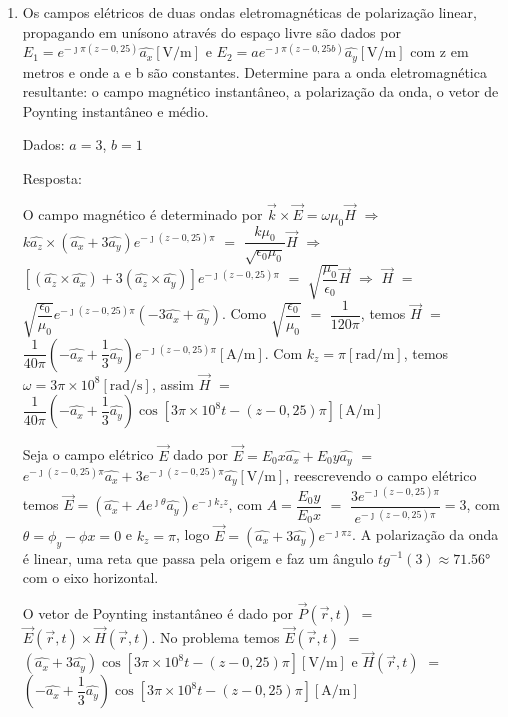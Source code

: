 \begin{enumerate}[1.]
\item Os campos elétricos de duas ondas eletromagnéticas de polarização linear, propagando em unísono através do espaço livre são dados por $E_{1} = e^{-\jmath \pi (z - 0,25)} \hat{a_{x}} [\si{\volt/\meter}]$ e $E_{2} = ae^{-\jmath \pi (z - 0,25b)} \hat{a_{y}} [\si{\volt/\meter}]$ com z em metros e onde a e b são constantes. Determine para a onda eletromagnética resultante: o campo magnético instantâneo, a polarização da onda, o vetor de Poynting instantâneo e médio.  
  

    Dados: $a = 3$, $b = 1$


    Resposta:

    O campo magnético é determinado por $\vec{k} \times \vec{E} = \omega \mu_{0} \vec{H}$ $\Rightarrow$ $k\hat{a_{z}} \times (\hat{a_{x}} + 3\hat{a_{y}})e^{-\jmath (z - 0,25)\pi}$ $=$ $\dfrac{k \mu_{0}}{\sqrt{\epsilon_{0}\mu_{0}}} \vec{H}$ $\Rightarrow$ $\left[ (\hat{a_{z}} \times \hat{a_{x}}) + 3(\hat{a_{z}} \times \hat{a_{y}}) \right]e^{-\jmath (z - 0,25)\pi}$ $=$ $\sqrt{\dfrac{\mu_{0}}{\epsilon_{0}}} \vec{H}$ $\Rightarrow$ $\vec{H}$ $=$ $\sqrt{\dfrac{\epsilon_{0}}{\mu_{0}}}e^{-\jmath (z - 0,25)\pi}\left(-3\hat{a_{x}} + \hat{a_{y}}\right)$. Como $\sqrt{\dfrac{\epsilon_{0}}{\mu_{0}}}$ $=$ $\dfrac{1}{120\pi}$, temos $\vec{H}$ $=$ $\dfrac{1}{40\pi}\left(-\hat{a_{x}} + \dfrac{1}{3}\hat{a_{y}}\right)e^{-\jmath (z - 0,25)\pi} [\si{\ampere/\meter}]$. Com $k_{z} = \pi [\si{\radian/\meter}]$, temos $\omega = 3\pi \times 10^{8} [\si{\radian/\second}]$, assim $\vec{H}$ $=$ $\dfrac{1}{40\pi}\left(-\hat{a_{x}} + \dfrac{1}{3}\hat{a_{y}}\right)\cos[3\pi \times 10^{8}t - (z - 0,25)\pi] [\si{\ampere/\meter}]$

    Seja o campo elétrico $\vec{E}$ dado por $\vec{E} = E_{0}x \hat{a_{x}} + E_{0}y \hat{ a_{y}}$  $=$ $e^{-\jmath (z - 0,25) \pi} \hat{a_{x}} + 3 e^{-\jmath (z - 0,25)\pi} \hat{a_{y}} [\si{\volt/\meter}]$, reescrevendo o campo elétrico temos $\vec{E} = (\hat{a_{x}} + A e^{\jmath \theta} \hat{a_{y}})e^{-\jmath k_{z} z}$, com $A = \dfrac{E_{0}y}{E_{0}x}$ $=$ $\dfrac{3 e^{-\jmath (z - 0,25)\pi}}{e^{-\jmath (z - 0,25) \pi}} = 3$, com $\theta = \phi_{y} - \phi{x}  = 0$ e $k_{z} = \pi$, logo $\vec{E} = (\hat{a_{x}} + 3 \hat{a_{y}})e^{-\jmath \pi z}$. A polarização da onda é linear, uma reta que passa pela origem e faz um ângulo $tg^{-1}(3) \approx 71.56\si{\degree}$ com o eixo horizontal.

    O vetor de Poynting instantâneo é dado por $\vec{P}(\vec{r},t)$ $=$ $\vec{E}(\vec{r},t) \times \vec{H}(\vec{r},t)$. No problema temos $\vec{E}(\vec{r},t)$ $=$ $\left(\hat{a_{x}} + 3\hat{a_{y}}\right)\cos[3\pi \times 10^{8}t - (z - 0,25)\pi] [\si{\volt/\meter}]$ e $\vec{H}(\vec{r},t)$ $=$ $\left(-\hat{a_{x}} + \dfrac{1}{3}\hat{a_{y}}\right)\cos[3\pi \times 10^{8}t - (z - 0,25)\pi] [\si{\ampere/\meter}]$
\end{enumerate}


